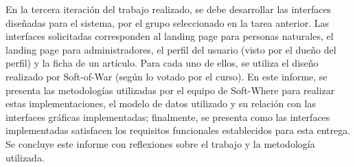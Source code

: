 En la tercera iteración del trabajo realizado, se debe desarrollar las interfaces diseñadas para el sistema, por el grupo seleccionado en la tarea anterior.
Las interfaces solicitadas corresponden al landing page para personas naturales, el landing page para administradores, el perfil del usuario (visto por el dueño del perfil) y la ficha de un artículo. Para cada uno de ellos, se utiliza el diseño realizado por Soft-of-War (según lo votado por el curso).
En este informe, se presenta las metodologías utilizadas por el equipo de Soft-Where para realizar estas implementaciones, el modelo de datos utilizado y su relación con las interfaces gráficas implementadas; finalmente, se presenta como las interfaces implementadas satisfacen los requisitos funcionales establecidos para esta entrega. 
Se concluye este informe con reflexiones sobre el trabajo y la metodología utilizada.